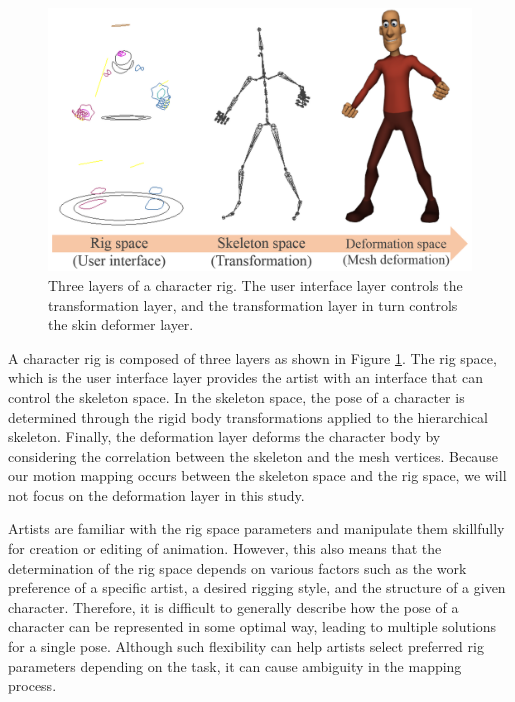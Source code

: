 \begin{figure}[ht]
  \centering
  \includegraphics[width=1.0\linewidth]{images/rigLayer}
  \caption{Three layers of a character rig. The user interface layer controls the transformation layer, and the transformation layer in turn controls the skin deformer layer.}
  \label{fig:rigLayer}
\end{figure}

A character rig is composed of three layers\cite{orvalho2012facial} as shown in Figure \ref{fig:rigLayer}. 
The rig space, which is the user interface layer provides the artist with an interface that can control the skeleton space. 
In the skeleton space, the pose of a character is determined through the rigid body transformations applied to the hierarchical skeleton. 
Finally, the deformation layer deforms the character body by considering the correlation between the skeleton and the mesh vertices. Because our motion mapping occurs between the skeleton space and the rig space, we will not focus on the deformation layer in this study.

Artists are familiar with the rig space parameters and manipulate them skillfully for creation or editing of animation. 
However, this also means that the determination of the rig space depends on various factors such as the work preference of a specific artist, a desired rigging style, and the structure of a given character. Therefore, it is difficult to generally describe how the pose of a character can be represented in some optimal way, leading to multiple solutions for a single pose. 
Although such flexibility can help artists select preferred rig parameters depending on the task, it can cause ambiguity in the mapping process. 

